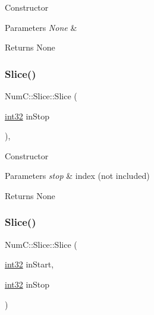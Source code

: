 Constructor


\begin{DoxyParams}{Parameters}
{\em None} & \\
\hline
\end{DoxyParams}
\begin{DoxyReturn}{Returns}
None 
\end{DoxyReturn}
\mbox{\label{class_num_c_1_1_slice_acb851855afd73f625da0cded5d66f60a}} 
\subsubsection{\texorpdfstring{Slice()}{Slice()}\hspace{0.1cm}{\footnotesize\ttfamily [2/4]}}
{\footnotesize\ttfamily Num\+C\+::\+Slice\+::\+Slice (\begin{DoxyParamCaption}\item[{\mbox{\hyperlink{namespace_num_c_aa5a7e69266097d55816d4cdb19542b53}{int32}}}]{in\+Stop }\end{DoxyParamCaption})\hspace{0.3cm}{\ttfamily [inline]}, {\ttfamily [explicit]}}

Constructor


\begin{DoxyParams}{Parameters}
{\em stop} & index (not included)\\
\hline
\end{DoxyParams}
\begin{DoxyReturn}{Returns}
None 
\end{DoxyReturn}
\mbox{\label{class_num_c_1_1_slice_af304ab5aaca67f7213ec55e969d1fab0}} 
\subsubsection{\texorpdfstring{Slice()}{Slice()}\hspace{0.1cm}{\footnotesize\ttfamily [3/4]}}
{\footnotesize\ttfamily Num\+C\+::\+Slice\+::\+Slice (\begin{DoxyParamCaption}\item[{\mbox{\hyperlink{namespace_num_c_aa5a7e69266097d55816d4cdb19542b53}{int32}}}]{in\+Start,  }\item[{\mbox{\hyperlink{namespace_num_c_aa5a7e69266097d55816d4cdb19542b53}{int32}}}]{in\+Stop }\end{DoxyParamCaption})\hspace{0.3cm}{\ttfamily [inline]}}

